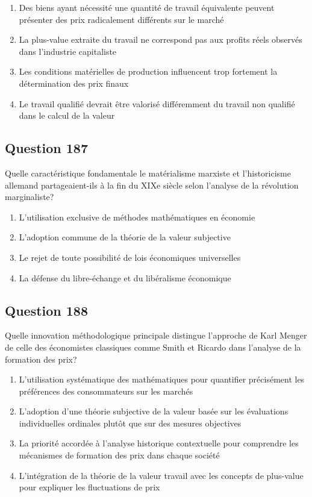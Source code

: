 \documentclass[12pt,a4paper]{article}
\begin{document}
\begin{enumerate}[label=\Alph*., leftmargin=*]
\item Des biens ayant nécessité une quantité de travail équivalente peuvent présenter des prix radicalement différents sur le marché
\item La plus-value extraite du travail ne correspond pas aux profits réels observés dans l'industrie capitaliste
\item Les conditions matérielles de production influencent trop fortement la détermination des prix finaux
\item Le travail qualifié devrait être valorisé différemment du travail non qualifié dans le calcul de la valeur
\end{enumerate}

\bigskip


\subsection*{Question 187}
Quelle caractéristique fondamentale le matérialisme marxiste et l'historicisme allemand partageaient-ils à la fin du XIXe siècle selon l'analyse de la révolution marginaliste?

\begin{enumerate}[label=\Alph*., leftmargin=*]
\item L'utilisation exclusive de méthodes mathématiques en économie
\item L'adoption commune de la théorie de la valeur subjective
\item Le rejet de toute possibilité de lois économiques universelles
\item La défense du libre-échange et du libéralisme économique
\end{enumerate}

\bigskip


\subsection*{Question 188}
Quelle innovation méthodologique principale distingue l'approche de Karl Menger de celle des économistes classiques comme Smith et Ricardo dans l'analyse de la formation des prix?

\begin{enumerate}[label=\Alph*., leftmargin=*]
\item L'utilisation systématique des mathématiques pour quantifier précisément les préférences des consommateurs sur les marchés
\item L'adoption d'une théorie subjective de la valeur basée sur les évaluations individuelles ordinales plutôt que sur des mesures objectives
\item La priorité accordée à l'analyse historique contextuelle pour comprendre les mécanismes de formation des prix dans chaque société
\item L'intégration de la théorie de la valeur travail avec les concepts de plus-value pour expliquer les fluctuations de prix
\end{enumerate}
\end{document}
